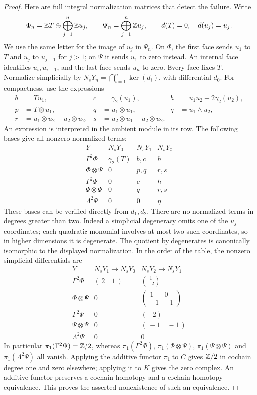 \begin{proof}
Here are full integral normalization matrices that detect the
failure. Write
\[
 \Phi_n=\mathbb Z T\oplus\bigoplus_{j=1}^n\mathbb Z u_j,
 \qquad \Psi_n=\bigoplus_{j=1}^n\mathbb Z u_j,
 \qquad d(T)=0,\quad d(u_j)=u_j.
\]
We use the same letter for the image of $u_j$ in $\Psi_n$.
On $\Phi$, the first face sends $u_1$ to $T$ and $u_j$ to
$u_{j-1}$ for $j>1$; on $\Psi$ it sends $u_1$ to zero instead.
An internal face identifies $u_i,u_{i+1}$, and the last face sends
$u_n$ to zero. Every face fixes $T$.
Normalize simplicially by $N_sY_n=\bigcap_{i=1}^n\ker(d_i)$,
with differential $d_0$. For compactness, use the expressions
\begin{align*}
 b&=Tu_1, & c&=\gamma_2(u_1),
 &h&=u_1u_2-2\gamma_2(u_2),\\
 p&=T\otimes u_1, & q&=u_1\otimes u_1,
 &\eta&=u_1\wedge u_2,\\
 r&=u_1\otimes u_2-u_2\otimes u_2,
 &s&=u_2\otimes u_1-u_2\otimes u_2.
\end{align*}
An expression is interpreted in the ambient module in its row.
The following bases give all nonzero normalized terms:
\[
\begin{array}{c|c|c|c}
Y&N_sY_0&N_sY_1&N_sY_2\\ \hline
\Gamma^2\Phi&\gamma_2(T)&b,c&h\\
\Phi\otimes\Psi&0&p,q&r,s\\
\Gamma^2\Psi&0&c&h\\
\Psi\otimes\Psi&0&q&r,s\\
\Lambda^2\Psi&0&0&\eta
\end{array}
\]
These bases can be verified directly from $d_1,d_2$.
There are no normalized terms in degrees greater than two.
Indeed a simplicial degeneracy omits one of the $u_j$ coordinates;
each quadratic monomial involves at most two such coordinates, so
in higher dimensions it is degenerate. The quotient by degenerates
is canonically isomorphic to the displayed normalization.
In the order of the table, the nonzero simplicial differentials are
\[
\begin{array}{c|c|c}
Y&N_sY_1\longrightarrow N_sY_0
 &N_sY_2\longrightarrow N_sY_1\\ \hline
\Gamma^2\Phi&(\,2\quad1\,)&\binom{1}{-2}\\
\Phi\otimes\Psi&0&
 \begin{pmatrix}1&0\\-1&-1\end{pmatrix}\\
\Gamma^2\Psi&0&(-2)\\
\Psi\otimes\Psi&0&(\,-1\quad-1\,)\\
\Lambda^2\Psi&0&0
\end{array}
\]
In particular $\pi_1(\Gamma^2\Psi)=\mathbb Z/2$, whereas
$\pi_1(\Gamma^2\Phi)$, $\pi_1(\Phi\otimes\Psi)$,
$\pi_1(\Psi\otimes\Psi)$ and $\pi_1(\Lambda^2\Psi)$ all vanish.
Applying the additive functor $\pi_1$ to $C$ gives $\mathbb Z/2$ in
cochain degree one and zero elsewhere; applying it to $K$ gives
the zero complex. An additive functor preserves a cochain homotopy
and a cochain homotopy equivalence. This proves the asserted
nonexistence of such an equivalence.


\end{proof}
